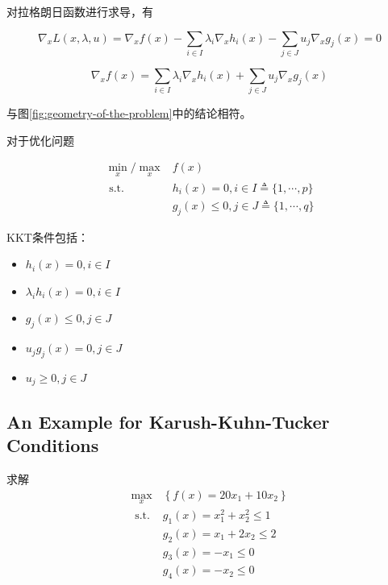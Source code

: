 \begin{theorem}[拉格朗日函数求导]
    对拉格朗日函数进行求导，有

\begin{equation} \nabla_{x} L(x, \lambda, u)=\nabla_{x} f(x)-\sum_{i \in I} \lambda_{i} \nabla_{x} h_{i}(x)-\sum_{j \in J} u_{j} \nabla_{x} g_{j}(x)=0 \end{equation}

\begin{equation}\nabla_{x} f(x)=\sum_{i \in I} \lambda_{i} \nabla_{x} h_{i}(x)+\sum_{j \in J} u_{j} \nabla_{x} g_{j}(x)\end{equation}

    与图\ref{fig:geometry-of-the-problem}中的结论相符。
\end{theorem}

\begin{theorem} 
    对于优化问题

    \begin{equation}\begin{aligned}
        \min _{x} / \max_x &f(x) \\
\text{ s.t. } & h_{i}(x)=0, i \in I \triangleq\{1, \cdots, p\} \\
&g_{j}(x) \leq 0, j \in J \triangleq\{1, \cdots, q\}
    \end{aligned}\end{equation}
    
    KKT条件包括：
\begin{itemize}
    \item $ h_{i}(x)=0, i \in I $
    \item $ \lambda_{i} h_{i}(x)=0, i \in I $
    \item $ g_{j}(x) \leq 0, j \in J $
    \item $ u_{j} g_{j}(x)=0, j \in J $
    \item $ u_{j} \geq 0, j \in J $
\end{itemize}
\end{theorem}


\subsection{An Example for Karush-Kuhn-Tucker Conditions}
   
\begin{problem}
    求解
\begin{equation}
\begin{aligned}
    \max _{x}&\left\{f(x)=20 x_{1}+10 x_{2}\right\} \\
  \text{ s.t. }  &   g_{1}(x)=x_{1}^{2}+x_{2}^{2} \leq 1 \\
  & g_{2}(x)=x_{1}+2 x_{2} \leq 2 \\
  &  g_{3}(x)=-x_{1} \leq 0 \\
    & g_{4}(x)=-x_{2} \leq 0 
\end{aligned}
\end{equation}
\end{problem}

